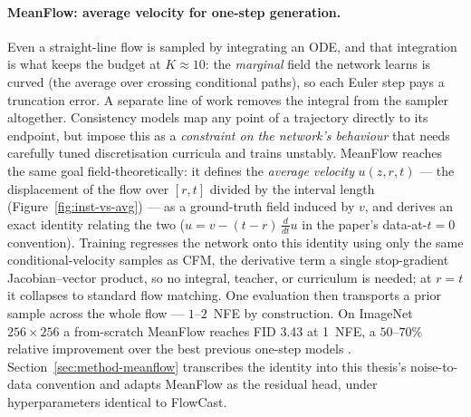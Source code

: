 \paragraph{MeanFlow: average velocity for one-step generation.} Even a straight-line flow is sampled by integrating an ODE, and that integration is what keeps the budget at $K \approx 10$: the \emph{marginal} field the network learns is curved (the average over crossing conditional paths), so each Euler step pays a truncation error. A separate line of work removes the integral from the sampler altogether. Consistency models \citep{song2023consistency,song2023improved} map any point of a trajectory directly to its endpoint, but impose this as a \emph{constraint on the network's behaviour} that needs carefully tuned discretisation curricula and trains unstably. MeanFlow \citep{geng2025meanflow} reaches the same goal field-theoretically: it defines the \emph{average velocity} $u(z, r, t)$ --- the displacement of the flow over $[r, t]$ divided by the interval length (Figure~\ref{fig:inst-vs-avg}) --- as a ground-truth field induced by $v$, and derives an exact identity relating the two ($u = v - (t - r)\,\frac{d}{dt}u$ in the paper's data-at-$t{=}0$ convention). Training regresses the network onto this identity using only the same conditional-velocity samples as CFM, the derivative term a single stop-gradient Jacobian--vector product, so no integral, teacher, or curriculum is needed; at $r = t$ it collapses to standard flow matching. One evaluation then transports a prior sample across the whole flow --- $1$--$2$~NFE by construction. On ImageNet $256 \times 256$ a from-scratch MeanFlow reaches FID 3.43 at 1~NFE, a $50$--$70\%$ relative improvement over the best previous one-step models \citep{geng2025meanflow}. Section~\ref{sec:method-meanflow} transcribes the identity into this thesis's noise-to-data convention and adapts MeanFlow as the residual head, under hyperparameters identical to FlowCast.

